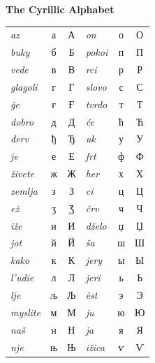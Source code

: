 \vspace*{\fill}
\begin{centering}
  \begin{table}[h!]
    \addtolength{\tabcolsep}{1em}
    \addtolength{\extrarowheight}{.75em}
    \centering
    \textbf{\LARGE The Cyrillic Alphabet}\\[3em]
    \Large
    \begin{tabular}{l c c @{\hskip 2em}||@{\hskip 2em} l c c}
      \emph{az} & а & А & \emph{on} & о & О \\
      \emph{buky} & б & Б & \emph{pokoi} & п & П \\
      \emph{vede} & в & В & \emph{rci} & р & Р \\
      \emph{glagoli} & г & Г & \emph{slovo} & с & С \\ 
      \emph{ġe} & ғ & Ғ & \emph{tvrdo} & т & Т \\
      \emph{dobro} & д & Д & \emph{će} & ћ & Ћ \\
      \emph{đerv} & ђ & Ђ & \emph{uk} & у & У \\ 
      \emph{je} & е & Е & \emph{frt} & ф & Ф \\
      \emph{živete} & ж & Ж & \emph{her} & х & Х \\
      \emph{zemlja} & з & З & \emph{ci} & ц & Ц \\
      \emph{ež} & ʒ & Ʒ & \emph{črv} & ч & Ч \\
      \emph{iže} & и & И & \emph{dželo} & џ & Џ \\
      \emph{jot} & й & Й & \emph{ša} & ш & Ш \\
      \emph{kako} & к & К & \emph{jery} & ы & Ы \\
      \emph{l'udie} & л & Л & \emph{jeri} & ь & Ь \\
      \emph{lje} & љ & Љ & \emph{èst} & э & Э \\
      \emph{myslite} & м & М & \emph{ju} & ю & Ю \\
      \emph{naš} & н & Н & \emph{ja} & я & Я \\
      \emph{nje} & њ & Њ & \emph{ižica} & ѵ & Ѵ\\
    \end{tabular}
  \end{table}
\end{centering}
\vspace*{\fill}
